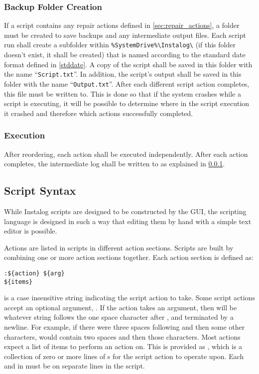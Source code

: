 \subsubsection{Backup Folder Creation} \label{sec:backup_folder}
If a script contains any repair actions defined in \ref{sec:repair_actions}, a
folder must be created to save backups and any intermediate output files.  Each
script run shall create a subfolder within \verb|%SystemDrive%\Instalog\| (if
this folder
doesn't exist, it shall be created) that is named according to the standard date
format defined in \ref{stddate}.  A copy of the script shall be saved in this
folder with the name ``\verb|Script.txt|''.  In addition, the script's output
shall be saved in this folder with the name ``\verb|Output.txt|''.  After each
different script action completes, this file must be written to.  This is done
so that if the system crashes while a script is executing, it will be possible
to determine where in the script execution it crashed and therefore which
actions successfully completed.

\subsubsection{Execution}
After reordering, each action shall be executed independently.  After each
action completes, the intermediate log shall be written to as explained in
\ref{sec:backup_folder}.

\subsection{Script Syntax} \label{sec:script_syntax}
While Instalog scripts are designed to be constructed by the GUI, the scripting
language is designed in such a way that editing them by hand with a simple text
editor is possible.  

Actions are listed in scripts in different action sections.  Scripts are built
by combining one or more action sections together.  Each action section is
defined as:
\begin{verbatim}
:${action} ${arg}
${items}
\end{verbatim}
 is a case insensitive string indicating the script action to take. 
Some script actions accept an optional argument, .  If the action takes an argument,
then  will be whatever string follows the one space character after
, and terminated by a newline.  For example, if there were three
spaces following  and then some other characters,  would contain two spaces and then
those characters.  Most actions expect a list of items to perform an action on. 
This is provided as , which is a collection of zero or more lines of
s for the script action to operate upon.  Each  and
 in  must be on separate lines in the script.

